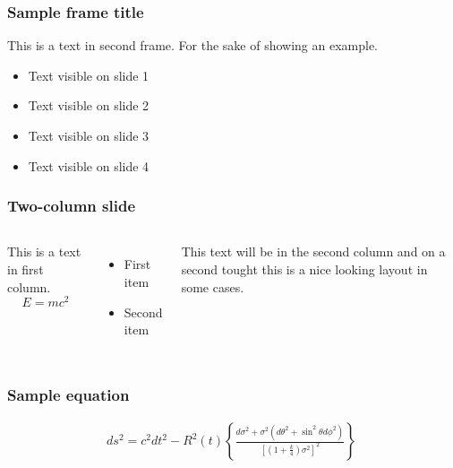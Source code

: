 \documentclass[10pt]{beamer}
\newlength{\wideitemsep}
\let\olditem\item
\renewcommand{\item}{\setlength{\itemsep}{\wideitemsep}\olditem}
\begin{document}
\begin{frame}
\frametitle{Sample frame title}
This is a text in second frame. 
For the sake of showing an example.
 
\begin{itemize}
 \item<1-> Text visible on slide 1
 \item<2-> Text visible on slide 2
 \item<3> Text visible on slide 3
 \item<4-> Text visible on slide 4
\end{itemize}
\end{frame}

\begin{frame}
\frametitle{Two-column slide}
 
\begin{columns}
 
This is a text in first column.
$$E=mc^2$$
\begin{itemize}
\item First item
\item Second item
\end{itemize}
 
This text will be in the second column
and on a second tought this is a nice looking
layout in some cases.
\end{columns}
\end{frame}

{
}

\begin{frame}
\frametitle{Sample equation}
\begin{gather}\label{eq:1}
ds^2=c^2dt^2-R^2(t)\left\{\frac{d\sigma^2+\sigma^2(d\theta^2+\sin^2\theta d\phi^2)}
    {\left[(1+\frac{k}{4})\sigma^2\right]^2}\right\}\:
\end{gather}
\end{frame}
\end{document}
